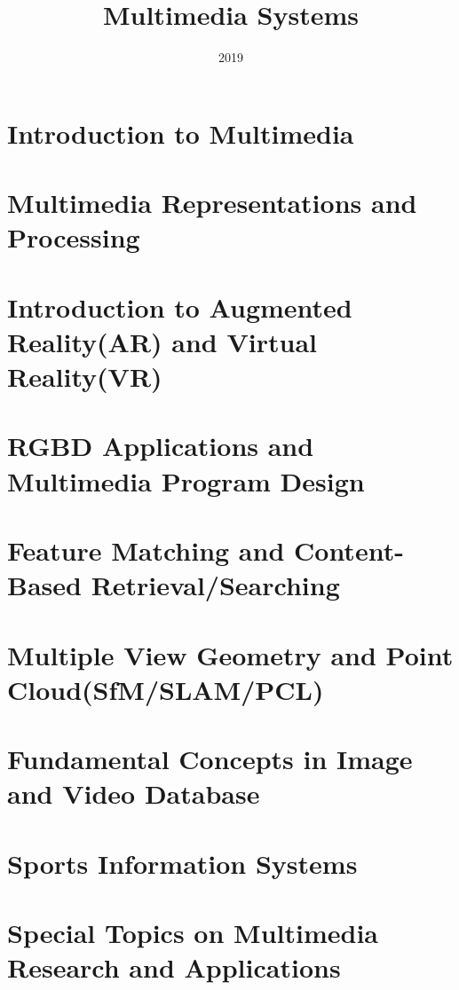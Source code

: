 \documentclass{article}
\title{Multimedia Systems}
\date{2019}
\begin{document}
\maketitle
 \section{Introduction to Multimedia}
 \section{Multimedia Representations and Processing}
 \section{Introduction to Augmented Reality(AR) and Virtual Reality(VR)}
 \section{RGBD Applications and Multimedia Program Design}
 \section{Feature Matching and Content-Based Retrieval/Searching}
 \section{Multiple View Geometry and Point Cloud(SfM/SLAM/PCL)}
 \section{Fundamental Concepts in Image and Video Database}
 \section{Sports Information Systems}
 \section{Special Topics on Multimedia Research and Applications}
 
\nocite{*} %


\end{document}
